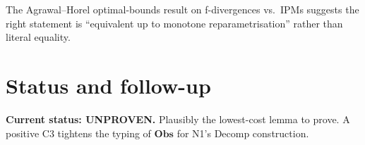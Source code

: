 \documentclass[11pt]{article}
\theoremstyle{plain}
\theoremstyle{definition}
\begin{document}
The Agrawal--Horel optimal-bounds result on f-divergences vs.\ IPMs
suggests the right statement is ``equivalent up to monotone
reparametrisation'' rather than literal equality.

\section{Status and follow-up}

\textbf{Current status: UNPROVEN.} Plausibly the lowest-cost lemma to
prove. A positive C3 tightens the typing of $\mathbf{Obs}$ for
N1's Decomp construction.



\end{document}
